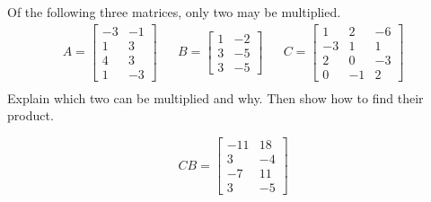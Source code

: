 
\begin{exerciseStatement}


Of the following three matrices, only two may be multiplied. 
\begin{align*} A= \left[\begin{array}{cc}
-3 & -1 \\
1 & 3 \\
4 & 3 \\
1 & -3
\end{array}\right]  & & B= \left[\begin{array}{cc}
1 & -2 \\
3 & -5 \\
3 & -5
\end{array}\right]  & & C= \left[\begin{array}{ccc}
1 & 2 & -6 \\
-3 & 1 & 1 \\
2 & 0 & -3 \\
0 & -1 & 2
\end{array}\right]  \\ \end{align*}
             Explain which two can be multiplied and why. Then show how to find their product.


\end{exerciseStatement}
    
\begin{exerciseAnswer} 
\[CB= \left[\begin{array}{cc}
-11 & 18 \\
3 & -4 \\
-7 & 11 \\
3 & -5
\end{array}\right] \]
\end{exerciseAnswer}
    
